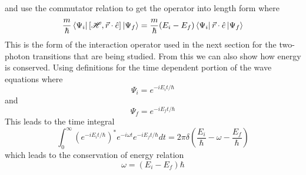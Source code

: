 and use the commutator relation to get the operator into length form where
\begin{equation}
   \frac{m}{\hbar} \bra{\Psi_i}[\mathscr{H},\Vec{r}\cdot\hat{e}]\ket{\Psi_f}=\frac{m}{\hbar}(E_i-E_f)\bra{\Psi_i}\Vec{r}\cdot\hat{e}\ket{\Psi_f}
\end{equation}
This is the form of the interaction operator used in the next section for the two-photon transitions that are being studied. From this we can also show how energy is conserved. Using definitions for the time dependent portion of the wave equations where
\begin{equation}
    \Psi_i=e^{-iE_i t/\hbar}
\end{equation}
and
\begin{equation}
    \Psi_f=e^{-iE_f t/\hbar}
\end{equation}
This leads to the time integral
\begin{equation}
    \int_0^\infty(e^{-iE_i t/\hbar})^* e^{-i\omega t}e^{-iE_f  t/\hbar}dt=2\pi\delta\left(\frac{E_i}{\hbar}-\omega-\frac{E_f}{\hbar}\right)
\end{equation}
which leads to the conservation of energy relation
\begin{equation}
    \omega=(E_i-E_f)\hbar
\end{equation}
